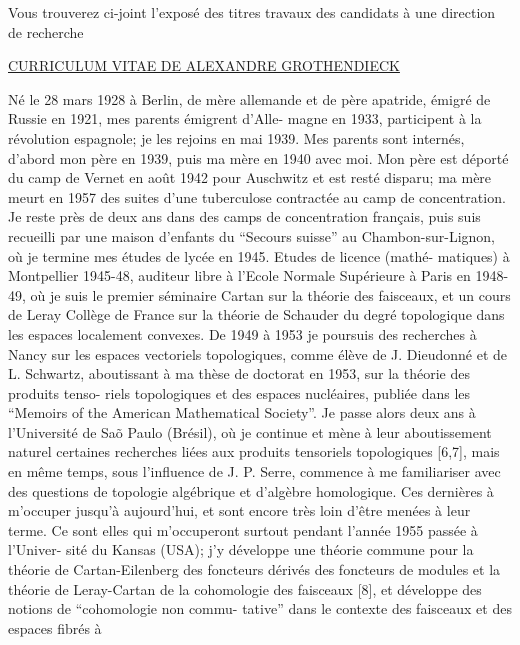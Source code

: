 Vous trouverez ci-joint l'exposé
des titres  travaux des candidats
à une direction de recherche

\uline{CURRICULUM VITAE DE ALEXANDRE GROTHENDIECK}

Né le 28 mars 1928 à Berlin, de mère allemande et de père
apatride, émigré de Russie en 1921, mes parents émigrent d'Alle-%
magne en 1933, participent à la révolution espagnole; je les
rejoins en mai 1939. Mes parents sont internés, d'abord mon père
en 1939, puis ma mère en 1940 avec moi. Mon père est déporté du
camp de Vernet en août 1942 pour Auschwitz et est resté disparu;
ma mère meurt en 1957 des suites d'une tuberculose contractée au
camp de concentration. Je reste près de deux ans dans des camps
de concentration français, puis suis recueilli par une maison
d'enfants du ``Secours suisse'' au Chambon-sur-Lignon, où je
termine mes études de lycée en 1945. Etudes de licence (mathé-%
matiques) à Montpellier 1945-48, auditeur libre à l'Ecole Normale
Supérieure à Paris en 1948-49, où je suis le premier séminaire
Cartan sur la théorie des faisceaux, et un cours de Leray 
Collège de France sur la théorie de Schauder du degré topologique
dans les espaces localement convexes. De 1949 à 1953 je poursuis
des recherches à Nancy sur les espaces vectoriels topologiques,
comme élève de J. Dieudonné et de L. Schwartz, aboutissant à ma
thèse de doctorat en 1953, sur la théorie des produits tenso-%
riels topologiques et des espaces nucléaires, publiée dans les
``Memoirs of the American Mathematical Society''. Je passe alors
deux ans à l'Université de Saõ Paulo (Brésil), où je continue
et mène à leur aboutissement naturel certaines recherches liées
aux produits tensoriels topologiques [6,7], mais en même temps,
sous l'influence de J. P. Serre, commence à me familiariser avec
des questions de topologie algébrique et d'algèbre homologique.
Ces dernières  à m'occuper jusqu'à aujourd'hui, et
sont encore très loin d'être menées à leur terme. Ce sont elles
qui m'occuperont surtout pendant l'année 1955 passée à l'Univer-%
sité du Kansas (USA); j'y développe une théorie commune pour la
théorie de Cartan-Eilenberg des foncteurs dérivés des foncteurs
de modules et la théorie de Leray-Cartan de la cohomologie des
faisceaux [8], et développe des notions de ``cohomologie non commu-%
tative'' dans le contexte des faisceaux et des espaces fibrés à

